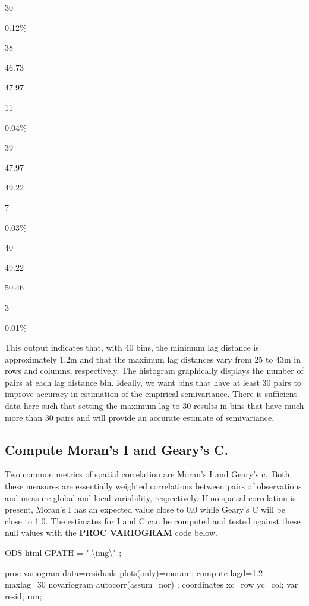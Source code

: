 \documentclass[
]{book}
\newenvironment{Shaded}{\begin{snugshade}}{\end{snugshade}}
\newcommand{\NormalTok}[1]{#1}
\begin{document}
30

0.12\%

38

46.73

47.97

11

0.04\%

39

47.97

49.22

7

0.03\%

40

49.22

50.46

3

0.01\%

This output indicates that, with 40 bins, the minimum lag distance is approximately 1.2m and that the maximum lag distances vary from 25 to 43m in rows and columns, respectively. The histogram graphically displays the number of pairs at each lag distance bin. Ideally, we want bins that have at least 30 pairs to improve accuracy in estimation of the empirical semivariance. There is sufficient data here such that setting the maximum lag to 30 results in bins that have much more than 30 pairs and will provide an accurate estimate of semivariance.

\hypertarget{compute-morans-i-and-gearys-c.}{%
\subsection{Compute Moran's I and Geary's C.}\label{compute-morans-i-and-gearys-c.}}

Two common metrics of spatial correlation are Moran's I and Geary's c.~Both these measures are essentially weighted correlations between pairs of observations and measure global and local variability, respectively. If no spatial correlation is present, Moran's I has an expected value close to 0.0 while Geary's C will be close to 1.0. The estimates for I and C can be computed and tested against these null values with the \textbf{PROC VARIOGRAM} code below.

\begin{Shaded}
\begin{Highlighting}[]
\NormalTok{ODS html GPATH = ".\textbackslash{}img\textbackslash{}" ;}

\NormalTok{proc variogram data=residuals plots(only)=moran ;}
\NormalTok{   compute lagd=1.2 maxlag=30 novariogram autocorr(assum=nor) ;}
\NormalTok{   coordinates xc=row yc=col;}
\NormalTok{   var resid;}
\NormalTok{run;}
\end{Highlighting}
\end{Shaded}
\end{document}
